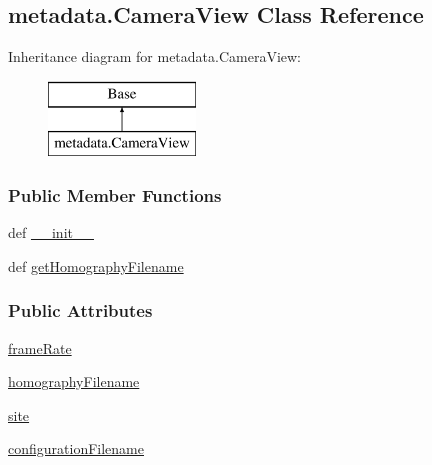\hypertarget{classmetadata_1_1CameraView}{\subsection{metadata.\-Camera\-View Class Reference}
\label{classmetadata_1_1CameraView}
}
Inheritance diagram for metadata.\-Camera\-View\-:\begin{figure}[H]
\begin{center}
\leavevmode
\includegraphics[height=2.000000cm]{classmetadata_1_1CameraView}
\end{center}
\end{figure}
\subsubsection*{Public Member Functions}
\begin{DoxyCompactItemize}
\item 
def \hyperlink{classmetadata_1_1CameraView_a3ce0b1e857b66e1899f8686db1f657b2}{\-\_\-\-\_\-init\-\_\-\-\_\-}
\item 
def \hyperlink{classmetadata_1_1CameraView_a18b16e48934d1157147e3bf53eac61d9}{get\-Homography\-Filename}
\end{DoxyCompactItemize}
\subsubsection*{Public Attributes}
\begin{DoxyCompactItemize}
\item 
\hyperlink{classmetadata_1_1CameraView_ae550f1d2d9dc3af754cf49370140cff0}{frame\-Rate}
\item 
\hyperlink{classmetadata_1_1CameraView_add6210fa2e81de03889b667218b5382a}{homography\-Filename}
\item 
\hyperlink{classmetadata_1_1CameraView_ade3d4831d427a621900ced9ffef79a08}{site}
\item 
\hyperlink{classmetadata_1_1CameraView_aa3cd42c9abe6e0dbb3e1ea54d1767f41}{configuration\-Filename}
\end{DoxyCompactItemize}
